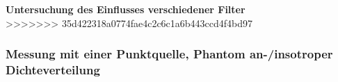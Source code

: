           \minipend\\ \ \\
            \textbf{Untersuchung des Einflusses verschiedener Filter}\\
            
>>>>>>> 35d422318a0774fae4c2c6c1a6b443ccd4f4bd97
        \subsubsection{Messung mit einer Punktquelle, Phantom an-/insotroper Dichteverteilung}